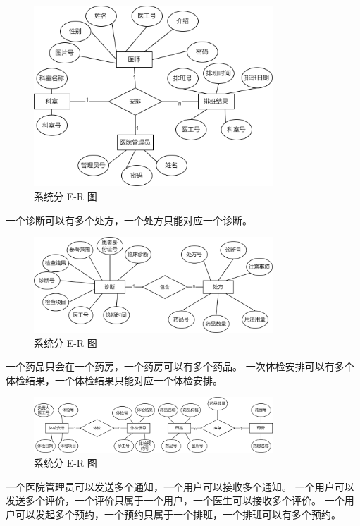 \documentclass{article}
\begin{document}
\begin{figure}[H]
    \centering
    \includegraphics[width=0.8\textwidth]{images/dividedER2.png}
    \caption{系统分 E-R 图}
\end{figure}

一个诊断可以有多个处方，一个处方只能对应一个诊断。

\begin{figure}[H]
    \centering
    \includegraphics[width=0.8\textwidth]{images/dividedER3.png}
    \caption{系统分 E-R 图}
\end{figure}

一个药品只会在一个药房，一个药房可以有多个药品。
一次体检安排可以有多个体检结果，一个体检结果只能对应一个体检安排。

\begin{figure}[H]
    \centering
    \includegraphics[width=0.8\textwidth]{images/dividedER4.png}
    \caption{系统分 E-R 图}
\end{figure}

一个医院管理员可以发送多个通知，一个用户可以接收多个通知。
一个用户可以发送多个评价，一个评价只属于一个用户，一个医生可以接收多个评价。
一个用户可以发起多个预约，一个预约只属于一个排班，一个排班可以有多个预约。
\end{document}
